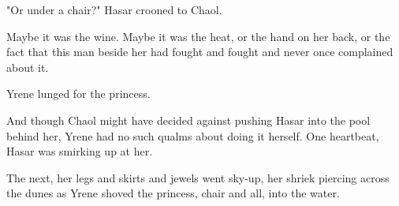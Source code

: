 "Or under a chair?"
Hasar crooned to Chaol.

Maybe it was the wine.
Maybe it was the heat, or the hand on her back, or the fact that this man beside her had fought and fought and never once complained about it.

Yrene lunged for the princess.

And though Chaol might have decided against pushing Hasar into the pool behind her, Yrene had no such qualms about doing it herself.
One heartbeat, Hasar was smirking up at her.

The next, her legs and skirts and jewels went sky-up, her shriek piercing across the dunes as Yrene shoved the princess, chair and all, into the water.

